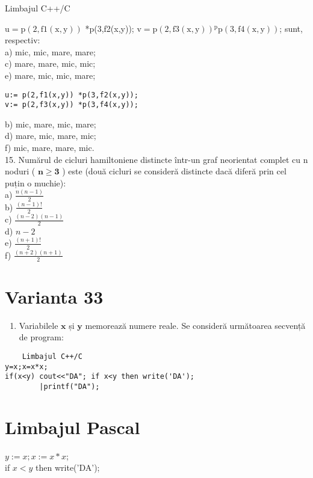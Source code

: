 Limbajul C++/C

$\mathrm{u}=\mathrm{p}(2, \mathrm{f} 1(\mathrm{x}, \mathrm{y}))$ *p(3,f2(x,y)); $\mathrm{v}=\mathrm{p}(2, \mathrm{f} 3(\mathrm{x}, \mathrm{y})){ }^{\mathrm{p}} \mathrm{p}(3, \mathrm{f} 4(\mathrm{x}, \mathrm{y}))$; sunt, respectiv:\\
a) mic, mic, mare, mare;\\
c) mare, mare, mic, mic;\\
e) mare, mic, mic, mare;

\begin{verbatim}
u:= p(2,f1(x,y)) *p(3,f2(x,y));
v:= p(2,f3(x,y)) *p(3,f4(x,y));
\end{verbatim}

b) mic, mare, mic, mare;\\
d) mare, mic, mare, mic;\\
f) mic, mare, mare, mic.\\
15. Numărul de cicluri hamiltoniene distincte într-un graf neorientat complet cu n noduri ( $\mathbf{n} \geq \mathbf{3}$ ) este (două cicluri se consideră distincte dacă diferă prin cel puțin o muchie):\\
a) $\frac{n(n-1)}{2}$\\
b) $\frac{(n-1)!}{2}$\\
c) $\frac{(n-2)(n-1)}{2}$\\
d) $n-2$\\
e) $\frac{(n+1)!}{2}$\\
f) $\frac{(n+2)(n+1)}{2}$

\section*{Varianta 33}
\begin{enumerate}
  \item Variabilele $\mathbf{x}$ și $\mathbf{y}$ memorează numere reale. Se consideră următoarea secvență de program:
\end{enumerate}

\begin{verbatim}
    Limbajul C++/C
y=x;x=x*x;
if(x<y) cout<<"DA"; if x<y then write('DA');
        |printf("DA");
\end{verbatim}

\section*{Limbajul Pascal}
$y:=x ; x:=x * x$;\\
if $x<y$ then write('DA');

